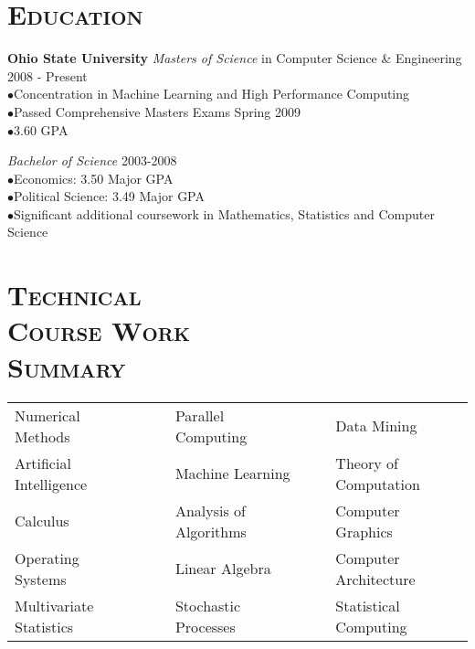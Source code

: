 \begin{resume}

\section{\textsc{Education}}

\textbf{Ohio State University}
\newline
\textit{Masters of Science} in Computer Science \& Engineering \hfill 2008 - Present \\
$\bullet$Concentration in Machine Learning and High Performance Computing\\
$\bullet$Passed Comprehensive Masters Exams Spring 2009 \\
$\bullet$3.60 GPA

\textit{Bachelor of Science} \hfill 2003-2008 \\
$\bullet$Economics: 3.50 Major GPA \\
$\bullet$Political Science: 3.49 Major GPA  \\
$\bullet$Significant additional coursework in Mathematics, Statistics and Computer Science

\section{\textsc{Technical \\  Course Work \\ Summary}}


\begin{tabular}{lllll}
Numerical Methods      & \ \ & Parallel Computing      & \ \ & Data Mining  \\
Artificial Intelligence   & \ \ & Machine Learning    & \ \ & Theory of Computation \\ 
Calculus     & \ \ & Analysis of Algorithms          & \ \ &  Computer Graphics    \\
Operating Systems      & \ \ & Linear Algebra           & \ \ & Computer Architecture \\
Multivariate Statistics      & \ \ & Stochastic Processes           & \ \ & Statistical Computing  \\
\end{tabular}

\begin{formatb}
  \\
  \body\\
\end{formatb}


\end{resume}
